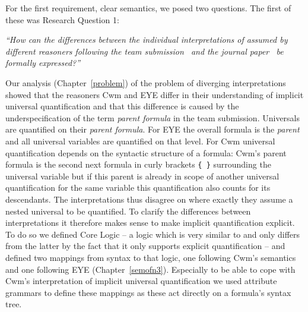 For the first requirement, clear semantics, we posed two questions. The first of these was Research Question 1:

\emph{``How can the differences between the individual interpretations of \nthree assumed by different reasoners 
following the \wwwc team submission~\cite{Notation3}
and the journal paper~\cite{N3Logic}
 be formally expressed?''} 

Our analysis (Chapter~\ref{problem}) of the problem of diverging interpretations showed that the reasoners Cwm and EYE differ in their understanding of implicit universal quantification 
and that this difference is caused by the underspecification of the term \emph{parent formula} in the \wwwc team submission.
Universals are quantified on their \emph{parent formula}. For EYE the overall formula is the \emph{parent} and all universal variables are quantified on that level. For Cwm 
universal quantification depends on the syntactic structure of a formula: Cwm's parent formula 
is the second next formula in curly brackets
\texttt{\{~\}} surrounding the universal variable but if this parent is already in scope of another universal quantification for the same variable this quantification also counts 
for its descendants. %
The interpretations thus disagree on where exactly they assume a nested universal to be quantified. To clarify the differences between interpretations it therefore makes sense to make
implicit quantification explicit. To do so we defined \nthree Core Logic -- a logic which is very similar to \nthree and only differs from the latter by the 
fact that it only supports explicit quantification -- and defined two mappings from \nthree syntax to that logic, one following Cwm's semantics and one following EYE (Chapter~\ref{semofn3}).
Especially to be able to cope with Cwm's interpretation of implicit universal quantification we used attribute grammars to define these mappings as these act directly 
on a formula's syntax tree.
%
% 
